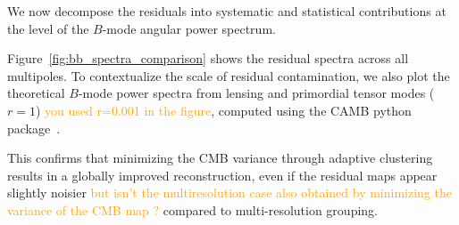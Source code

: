 \documentclass[fleqn,usenatbib]{mnras}
\newcommand{\je}[1]{\textcolor{orange}{#1}}
\begin{document}
We now decompose the residuals into systematic and statistical contributions at the level of the \( B \)-mode angular power spectrum.

Figure~\ref{fig:bb_spectra_comparison} shows the residual spectra across all multipoles.  
To contextualize the scale of residual contamination, we also plot the theoretical \( B \)-mode power spectra from lensing and primordial tensor modes (\( r=1 \)) \je{you used r=0.001 in the figure}, computed using the CAMB python package~\citep{CAMB}.

This confirms that minimizing the CMB variance through adaptive clustering results in a globally improved reconstruction, even if the residual maps appear slightly noisier \je{but isn't the multiresolution case also obtained by minimizing the variance of the CMB map ?} compared to multi-resolution grouping.
\end{document}
